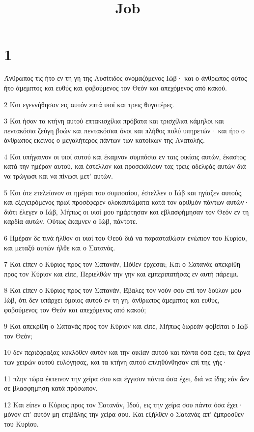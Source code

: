 

\title{Job}


\chapter{1}

\par Άνθρωπος τις ήτο εν τη γη της Αυσίτιδος ονομαζόμενος Ιώβ· και ο άνθρωπος ούτος ήτο άμεμπτος και ευθύς και φοβούμενος τον Θεόν και απεχόμενος από κακού.
\par 2 Και εγεννήθησαν εις αυτόν επτά υιοί και τρεις θυγατέρες.
\par 3 Και ήσαν τα κτήνη αυτού επτακισχίλια πρόβατα και τρισχίλιαι κάμηλοι και πεντακόσια ζεύγη βοών και πεντακόσιαι όνοι και πλήθος πολύ υπηρετών· και ήτο ο άνθρωπος εκείνος ο μεγαλήτερος πάντων των κατοίκων της Ανατολής.
\par 4 Και υπήγαινον οι υιοί αυτού και έκαμνον συμπόσια εν ταις οικίαις αυτών, έκαστος κατά την ημέραν αυτού, και έστελλον και προσεκάλουν τας τρεις αδελφάς αυτών διά να τρώγωσι και να πίνωσι μετ' αυτών.
\par 5 Και ότε ετελείονον αι ημέραι του συμποσίου, έστελλεν ο Ιώβ και ηγίαζεν αυτούς, και εξεγειρόμενος πρωΐ προσέφερεν ολοκαυτώματα κατά τον αριθμόν πάντων αυτών· διότι έλεγεν ο Ιώβ, Μήπως οι υιοί μου ημάρτησαν και εβλασφήμησαν τον Θεόν εν τη καρδία αυτών. Ούτως έκαμνεν ο Ιώβ, πάντοτε.
\par 6 Ημέραν δε τινά ήλθον οι υιοί του Θεού διά να παρασταθώσιν ενώπιον του Κυρίου, και μεταξύ αυτών ήλθε και ο Σατανάς.
\par 7 Και είπεν ο Κύριος προς τον Σατανάν, Πόθεν έρχεσαι; Και ο Σατανάς απεκρίθη προς τον Κύριον και είπε, Περιελθών την γην και εμπεριπατήσας εν αυτή πάρειμι.
\par 8 Και είπεν ο Κύριος προς τον Σατανάν, Έβαλες τον νούν σου επί τον δούλον μου Ιώβ, ότι δεν υπάρχει όμοιος αυτού εν τη γη, άνθρωπος άμεμπτος και ευθύς, φοβούμενος τον Θεόν και απεχόμενος από κακού;
\par 9 Και απεκρίθη ο Σατανάς προς τον Κύριον και είπε, Μήπως δωρεάν φοβείται ο Ιώβ τον Θεόν;
\par 10 δεν περιέφραξας κυκλόθεν αυτόν και την οικίαν αυτού και πάντα όσα έχει; τα έργα των χειρών αυτού ευλόγησας, και τα κτήνη αυτού επληθύνθησαν επί της γής·
\par 11 πλην τώρα έκτεινον την χείρα σου και έγγισον πάντα όσα έχει, διά να ίδης εάν δεν σε βλασφημήση κατά πρόσωπον.
\par 12 Και είπεν ο Κύριος προς τον Σατανάν, Ιδού, εις την χείρα σου πάντα όσα έχει· μόνον επ' αυτόν μη επιβάλης την χείρα σου. Και εξήλθεν ο Σατανάς απ' έμπροσθεν του Κυρίου.
